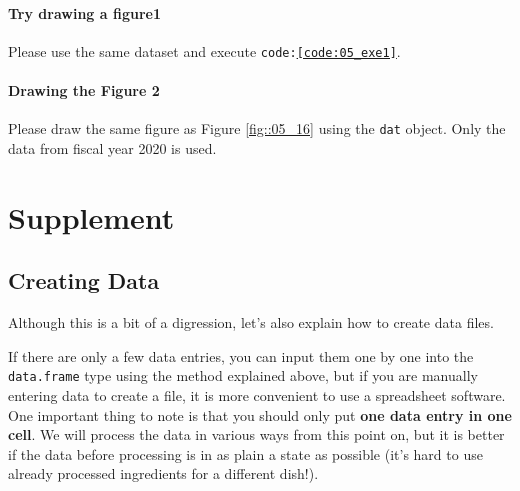 \documentclass{ltjsbook}
\begin{document}
\paragraph{Try drawing a figure1} Please use the same dataset and execute \texttt{code:\ref{code:05_exe1}}.



\paragraph{Drawing the Figure 2} Please draw the same figure as Figure \ref{fig::05_16} using the \verb|dat| object. Only the data from fiscal year 2020 is used.


\newpage
\section{Supplement}
\subsection{Creating Data}
\label{MakingData}
Although this is a bit of a digression, let's also explain how to create data files.

If there are only a few data entries, you can input them one by one into the \texttt{data.frame} type using the method explained above, but if you are manually entering data to create a file, it is more convenient to use a spreadsheet software. One important thing to note is that you should only put \textbf{one data entry in one cell}. We will process the data in various ways from this point on, but it is better if the data before processing is in as plain a state as possible (it's hard to use already processed ingredients for a different dish!).
\end{document}
